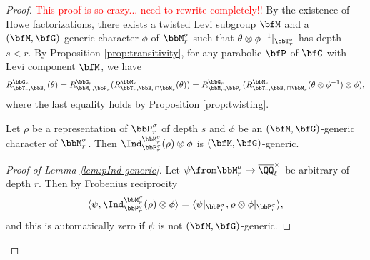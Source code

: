 \newpage

\begin{proof} 
  \textcolor{red}{This proof is so crazy... need to rewrite completely!!}
  By the existence of Howe factorizations, there exists a twisted Levi subgroup $\bfM$ and a $(\bfM,\bfG)$-generic character $\phi$ of $\bbM_r^\sigma$ such that $\theta \otimes \phi^{-1}|_{\bbT_r^\sigma}$ has depth $s < r$. By Proposition \ref{prop:transitivity}, for any parabolic $\bfP$ of $\bfG$ with Levi component $\bfM$, we have
\begin{equation*}
  R_{\bbT_r,\bbB_r}^{\bbG_r}(\theta) = R_{\bbM_r,\bbP_r}^{\bbG_r}(R_{\bbT_r,\bbB_r \cap \bbM_r}^{\bbM_r}(\theta)) = R_{\bbM_r,\bbP_r}^{\bbG_r}(R_{\bbT_r, \bbB_r \cap \bbM_r}^{\bbM_r}(\theta \otimes \phi^{-1}) \otimes \phi),
\end{equation*}
where the last equality holds by Proposition \ref{prop:twisting}.

\begin{lemma}\label{lem:pInd generic}
  Let $\rho$ be a representation of $\bbP_r^\sigma$ of depth $s$ and $\phi$ be an $(\bfM,\bfG)$-generic character of $\bbM_r^\sigma$. Then $\Ind_{\bbP_r^\sigma}^{\bbM_r^\sigma}(\rho) \otimes \phi$ is $(\bfM,\bfG)$-generic.
\end{lemma}


\begin{proof}[Proof of Lemma \ref{lem:pInd generic}]
  Let $\psi \from \bbM_r^\sigma \to \overline \QQ_\ell^\times$ be arbitrary of depth $r$. Then by Frobenius reciprocity
  \begin{equation*}
    \langle \psi, \Ind_{\bbP_r^\sigma}^{\bbM_r^\sigma}(\rho) \otimes \phi \rangle = \langle \psi|_{\bbP_r^\sigma}, \rho \otimes \phi|_{\bbP_r^\sigma} \rangle,
  \end{equation*}
  and this is automatically zero if $\psi$ is not $(\bfM,\bfG)$-generic.
\end{proof}


\end{proof}
